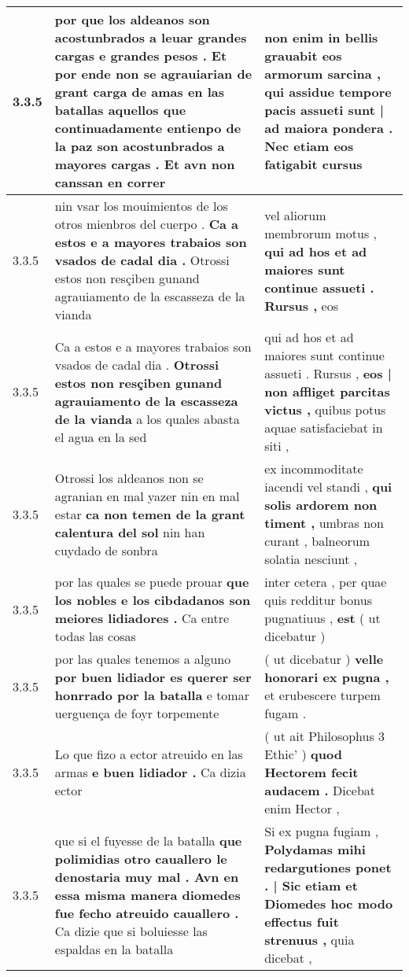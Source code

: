 \begin{tabular}{|p{1cm}|p{6.5cm}|p{6.5cm}|}
3.3.5 & por que los aldeanos son acostunbrados a leuar grandes cargas e grandes pesos . Et por ende non se agrauiarian de grant carga de amas en las batallas \textbf{ aquellos que continuadamente entienpo de la paz son acostunbrados a mayores cargas . } Et avn non canssan en correr & non enim in bellis grauabit eos armorum sarcina , \textbf{ qui assidue tempore pacis assueti sunt | ad maiora pondera . } Nec etiam eos fatigabit cursus \\\hline
3.3.5 & nin vsar los mouimientos de los otros mienbros del cuerpo . \textbf{ Ca a estos e a mayores trabaios son vsados de cadal dia . } Otrossi estos non resçiben gunand agrauiamento de la escasseza de la vianda & vel aliorum membrorum motus , \textbf{ qui ad hos et ad maiores sunt continue assueti . Rursus , } eos \\\hline
3.3.5 & Ca a estos e a mayores trabaios son vsados de cadal dia . \textbf{ Otrossi estos non resçiben gunand agrauiamento de la escasseza de la vianda } a los quales abasta el agua en la sed & qui ad hos et ad maiores sunt continue assueti . Rursus , \textbf{ eos | non affliget parcitas victus , } quibus potus aquae satisfaciebat in siti , \\\hline
3.3.5 & Otrossi los aldeanos non se agranian en mal yazer nin en mal estar \textbf{ ca non temen de la grant calentura del sol } nin han cuydado de sonbra & ex incommoditate iacendi vel standi , \textbf{ qui solis ardorem non timent , } umbras non curant , balneorum solatia nesciunt , \\\hline
3.3.5 & por las quales se puede prouar \textbf{ que los nobles e los cibdadanos son meiores lidiadores . } Ca entre todas las cosas & inter cetera , per quae quis redditur bonus pugnatiuus , \textbf{ est } ( ut dicebatur ) \\\hline
3.3.5 & por las quales tenemos a alguno \textbf{ por buen lidiador es querer ser honrrado por la batalla } e tomar uerguença de foyr torpemente & ( ut dicebatur ) \textbf{ velle honorari ex pugna , } et erubescere turpem fugam . \\\hline
3.3.5 & Lo que fizo a ector atreuido en las armas \textbf{ e buen lidiador . } Ca dizia ector & ( ut ait Philosophus 3 Ethic’ ) \textbf{ quod Hectorem fecit audacem . } Dicebat enim Hector , \\\hline
3.3.5 & que si el fuyesse de la batalla \textbf{ que polimidias otro cauallero le denostaria muy mal . Avn en essa misma manera diomedes fue fecho atreuido cauallero . } Ca dizie que si boluiesse las espaldas en la batalla & Si ex pugna fugiam , \textbf{ Polydamas mihi redargutiones ponet . | Sic etiam et Diomedes hoc modo effectus fuit strenuus , } quia dicebat , \\\hline

\end{tabular}
